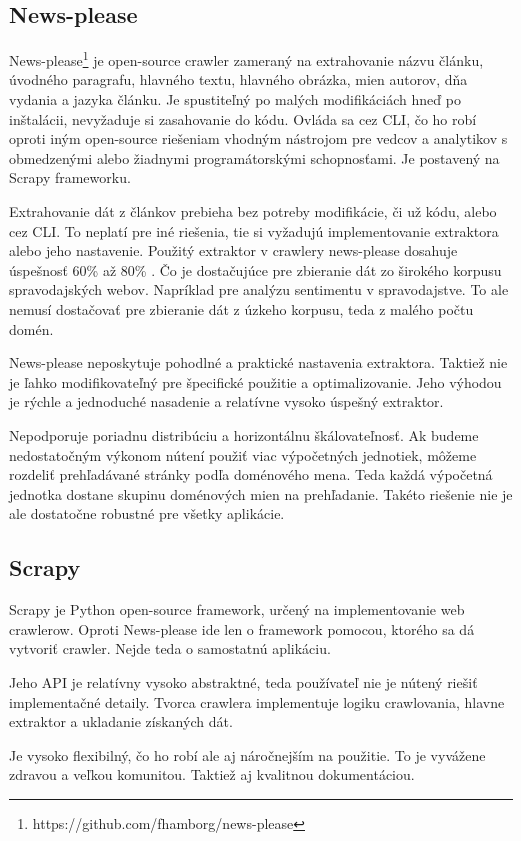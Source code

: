 \subsection{News-please}
News-please\footnote{https://github.com/fhamborg/news-please} je open-source crawler zameraný na extrahovanie názvu článku, úvodného paragrafu, hlavného textu, hlavného obrázka, mien autorov, dňa vydania a jazyka článku. Je spustiteľný po malých modifikáciách hneď po inštalácii, nevyžaduje si zasahovanie do kódu. Ovláda sa cez CLI, čo ho robí oproti iným open-source riešeniam vhodným nástrojom pre vedcov a analytikov s obmedzenými alebo žiadnymi programátorskými schopnosťami. Je postavený na Scrapy frameworku. 

Extrahovanie dát z článkov prebieha bez potreby modifikácie, či už kódu, alebo cez CLI. To neplatí pre iné riešenia, tie si vyžadujú implementovanie extraktora alebo jeho nastavenie. Použitý extraktor v crawlery news-please dosahuje úspešnosť 60\% až 80\% \cite{newsPlease}. Čo je dostačujúce pre zbieranie dát zo širokého korpusu spravodajských webov. Napríklad pre analýzu sentimentu v spravodajstve. To ale nemusí dostačovať pre zbieranie dát z úzkeho korpusu, teda z malého počtu domén. 

News-please neposkytuje pohodlné a praktické nastavenia extraktora. Taktiež nie je ľahko modifikovateľný pre špecifické použitie a optimalizovanie. Jeho výhodou je rýchle a jednoduché nasadenie a relatívne vysoko úspešný extraktor. 

Nepodporuje poriadnu distribúciu a horizontálnu škálovateľnosť. Ak budeme nedostatočným výkonom nútení použiť viac výpočetných jednotiek, môžeme rozdeliť prehľadávané stránky podľa doménového mena. Teda každá výpočetná jednotka dostane skupinu doménových mien na prehľadanie. Takéto riešenie nie je ale dostatočne robustné pre všetky aplikácie. 

\subsection{Scrapy} 
Scrapy je Python open-source framework, určený na implementovanie web crawlerow. Oproti News-please ide len o framework pomocou, ktorého sa dá vytvoriť crawler. Nejde teda o samostatnú aplikáciu. 

Jeho API je relatívny vysoko abstraktné, teda používateľ nie je nútený riešiť implementačné detaily. Tvorca crawlera implementuje logiku crawlovania, hlavne extraktor a ukladanie získaných dát.

Je vysoko flexibilný, čo ho robí ale aj náročnejším na použitie. To je vyvážene zdravou a veľkou komunitou. Taktiež aj kvalitnou dokumentáciou. 

